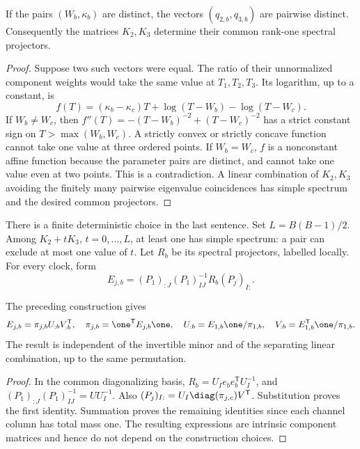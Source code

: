 \begin{lemma}\label{lem:v82-separation}
If the pairs $(W_b,\kappa_b)$ are distinct, the vectors
$(q_{2,b},q_{3,b})$ are pairwise distinct.
Consequently the matrices $K_2,K_3$ determine their common rank-one
spectral projectors.
\end{lemma}
\begin{proof}
Suppose two such vectors were equal. The ratio of their unnormalized
component weights would take the same value at $T_1,T_2,T_3$.
Its logarithm, up to a constant, is
\[
 f(T)=(\kappa_b-\kappa_c)T+
                      \log(T-W_b)-\log(T-W_c).
\]
If $W_b\ne W_c$, then
$f''(T)=-(T-W_b)^{-2}+(T-W_c)^{-2}$ has a strict constant sign
on $T>\max(W_b,W_c)$. A strictly convex or strictly concave function
cannot take one value at three ordered points. If $W_b=W_c$, $f$ is
a nonconstant affine function because the parameter pairs are distinct,
and cannot take one value even at two points. This is a contradiction.
A linear combination of $K_2,K_3$ avoiding the finitely many pairwise
eigenvalue coincidences has simple spectrum and the desired common
projectors.
\end{proof}

There is a finite deterministic choice in the last sentence. Set
$L=B(B-1)/2$. Among $K_2+tK_3$, $t=0,\ldots,L$, at least one has
simple spectrum: a pair can exclude at most one value of $t$.
Let $R_b$ be its spectral projectors, labelled locally. For every clock,
form
\begin{equation}\label{eq:v82-component-matrices}
 E_{j,b}=(P_1)_{:J}(P_1)_{IJ}^{-1}R_b(P_j)_{I:}.
\end{equation}

\begin{lemma}
\label{lem:v82-components}
The preceding construction gives
\[
 E_{j,b}=\pi_{j,b}U_{:b}V_{:b}^{\mathsf T},\quad
 \pi_{j,b}=\one^{\mathsf T}E_{j,b}\one,\quad
 U_{:b}=E_{1,b}\one/\pi_{1,b},\quad
 V_{:b}=E_{1,b}^{\mathsf T}\one/\pi_{1,b}.
\]
The result is independent of the invertible minor and of the separating
linear combination, up to the same permutation.
\end{lemma}
\begin{proof}
In the common diagonalizing basis,
$R_b=U_I e_be_b^{\mathsf T}U_I^{-1}$, and
$(P_1)_{:J}(P_1)_{IJ}^{-1}=UU_I^{-1}$.
Also $(P_j)_{I:}=U_I\diag(\pi_{j,c})V^{\mathsf T}$.
Substitution proves the first identity. Summation proves the remaining
identities since each channel column has total mass one. The resulting
expressions are intrinsic component matrices and hence do not depend
on the construction choices.
\end{proof}

